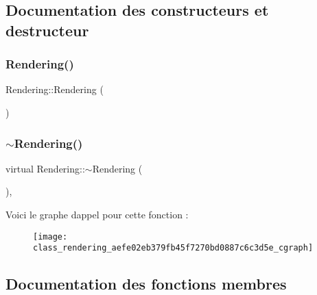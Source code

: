 \subsection{Documentation des constructeurs et destructeur}
\mbox{\label{class_rendering_a2d6135f6f0563031d59f12e81c15416d}} 
\subsubsection{\texorpdfstring{Rendering()}{Rendering()}}
{\footnotesize\ttfamily Rendering\+::\+Rendering (\begin{DoxyParamCaption}{ }\end{DoxyParamCaption})\hspace{0.3cm}{\ttfamily [inline]}}

\mbox{\label{class_rendering_aefe02eb379fb45f7270bd0887c6c3d5e}} 
\subsubsection{\texorpdfstring{$\sim$\+Rendering()}{~Rendering()}}
{\footnotesize\ttfamily virtual Rendering\+::$\sim$\+Rendering (\begin{DoxyParamCaption}{ }\end{DoxyParamCaption})\hspace{0.3cm}{\ttfamily [inline]}, {\ttfamily [virtual]}}

Voici le graphe d\textquotesingle{}appel pour cette fonction \+:\nopagebreak
\begin{figure}[H]
\begin{center}
\leavevmode
\texttt{[image: class\_rendering\_aefe02eb379fb45f7270bd0887c6c3d5e\_cgraph]}
\end{center}
\end{figure}


\subsection{Documentation des fonctions membres}
\mbox{\label{class_rendering_a93693702cf5a7709a7b1ddc7a7d3d8d3}} 
